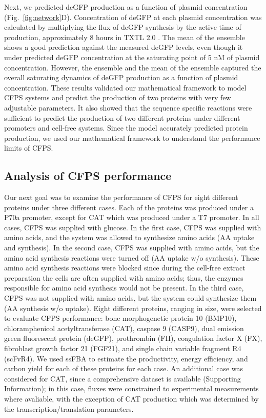 \documentclass[journal=asbcd6,manuscript=article]{achemso}
\begin{document}
Next, we predicted deGFP production as a function of plasmid concentration (Fig.~\ref{fig:network}D).
Concentration of deGFP at each plasmid concentration was calculated by multiplying the flux of deGFP synthesis by the active time of production, approximately 8 hours in TXTL 2.0 \cite{Garamella:2016aa}.
The mean of the ensemble shows a good prediction against the measured deGFP levels, even though it under predicted deGFP concentration at the saturating point of 5 nM of plasmid concentration.
However, the ensemble and the mean of the ensemble captured the overall saturating dynamics of deGFP production as a function of plasmid concentration.
These results validated our mathematical framework to model CFPS systems and predict the production of two proteins with very few adjustable parameters.
It also showed that the sequence specific reactions were sufficient to predict the production of two different proteins under different promoters and cell-free systems.
Since the model accurately predicted protein production, we used our mathematical framework to understand the performance limits of CFPS.

\subsection{Analysis of CFPS performance}
Our next goal was to examine the performance of CFPS for eight different proteins under three different cases.
Each of the proteins was produced under a P70a promoter, except for CAT which was produced under a T7 promoter.
In all cases, CFPS was supplied with glucose.
In the first case, CFPS was supplied with amino acids, and the system was allowed to synthesize amino acids (AA uptake and synthesis).
In the second case, CFPS was supplied with amino acids, but the amino acid synthesis reactions were turned off (AA uptake w/o synthesis).
These amino acid synthesis reactions were blocked since during the cell-free extract preparation the cells are often supplied with amino acids; thus, the enzymes responsible for amino acid synthesis would not be present.
In the third case, CFPS was not supplied with amino acids, but the system could synthesize them (AA synthesis w/o uptake).
Eight different proteins, ranging in size, were selected to evaluate CFPS performance: bone morphogenetic protein 10 (BMP10), chloramphenicol acetyltransferase (CAT), caspase 9 (CASP9), dual emission green fluorescent protein (deGFP), prothrombin (FII), coagulation factor X (FX), fibroblast growth factor 21 (FGF21), and single chain variable fragment R4 (scFvR4).
We used ssFBA to estimate the productivity, energy efficiency, and carbon yield for each of these proteins for each case.
An additional case was considered for CAT, since a comprehensive dataset is available (Supporting Information); in this case, fluxes were constrained to experimental measurements where avaliable, with the exception of CAT production which was determined by the transcription/translation parameters.
\end{document}
